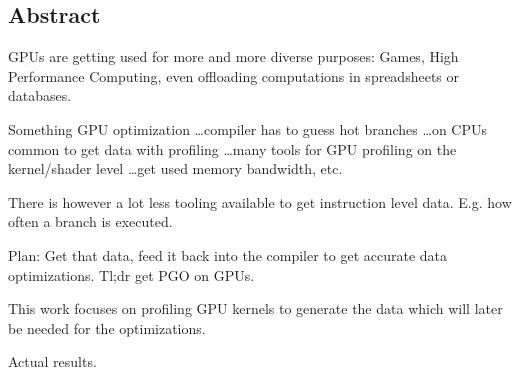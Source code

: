 \newpage
\vspace*{3.5cm}
\begin{center}
\begin{minipage}{12.5cm}
\section*{Abstract}
GPUs are getting used for more and more diverse purposes: Games, High Performance Computing, even offloading computations in spreadsheets or databases.

Something GPU optimization \dots compiler has to guess hot branches \dots on CPUs common to get data with profiling \dots many tools for GPU profiling on the kernel/shader level \dots get used memory bandwidth, etc.

There is however a lot less tooling available to get instruction level data. E.g. how often a branch is executed.

Plan: Get that data, feed it back into the compiler to get accurate data optimizations. Tl;dr get PGO on GPUs.

This work focuses on profiling GPU kernels to generate the data which will later be needed for the optimizations.

Actual results.

\end{minipage}
\end{center}



